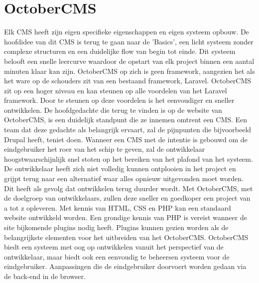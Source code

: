 \section{OctoberCMS}
Elk CMS heeft zijn eigen specifieke eigenschappen en eigen systeem opbouw. De hoofdidee van dit CMS is terug te gaan naar de 'Basics', een licht systeem zonder complexe structuren en een duidelijke flow van begin tot einde. Dit systeem belooft een snelle leercurve waardoor de opstart van elk project binnen een aantal minuten klaar kan zijn. OctoberCMS op zich is geen framework, aangezien het als het ware op de schouders zit van een bestaand framework, Laravel. OctoberCMS zit op een hoger niveau en kan steunen op alle voordelen van het Laravel framework. Door te steunen op deze voordelen is het eenvoudiger en sneller ontwikkelen. 
\newline\newline
De hoofdgedachte die terug te vinden is op de website van OctoberCMS, is een duidelijk standpunt die ze innemen omtrent een CMS.
\newline\newline
{}
\newline\newline
Een team dat deze gedachte als belangrijk ervaart, zal de pijnpunten die bijvoorbeeld Drupal heeft, teniet doen. Wanneer een CMS met de intentie is gebouwd om de eindgebruiker het roer van het schip te geven, zal de ontwikkelaar hoogstwaarschijnlijk snel stoten op het bereiken van het plafond van het systeem. De ontwikkelaar heeft zich niet volledig kunnen ontplooien in het project en grijpt terug naar een alternatief waar alles opnieuw uitgevonden moet worden. Dit heeft als gevolg dat ontwikkelen terug duurder wordt.
\newline\newline
Met OctoberCMS, met de doelgroep van ontwikkelaars, zullen deze sneller en goedkoper een project van a tot z opleveren.  Met kennis van HTML, CSS en PHP kan een standaard website ontwikkeld worden. Een grondige kennis van PHP is vereist wanneer de site bijkomende plugins nodig heeft. Plugins kunnen gezien worden als de belangrijkste elementen voor het uitbreiden van het OctoberCMS.
\newline\newline
OctoberCMS biedt een systeem met oog op ontwikkelen vanuit het perspectief van de ontwikkelaar, maar biedt ook een eenvoudig te beheersen systeem voor de eindgebruiker. Aanpassingen die de eindgebruiker doorvoert worden gedaan via de back-end in de browser. 